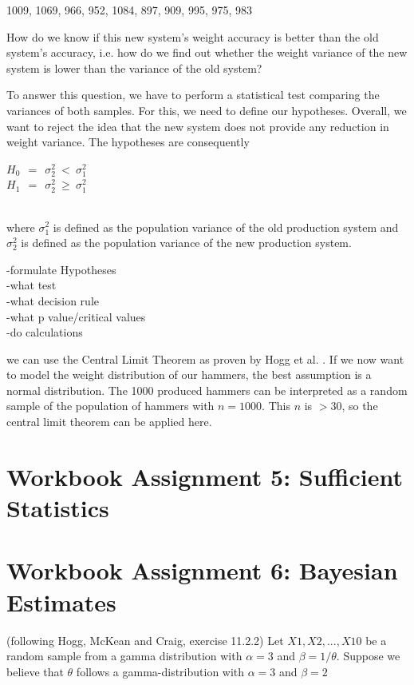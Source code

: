 \begin{center}
    1009, 1069, 966, 952, 1084, 897, 909, 995, 975, 983
\end{center}

How do we know if this new system's weight accuracy is better than the old system's accuracy, i.e. how do we find out whether the weight variance of the new system is lower than the variance of the old system?

To answer this question, we have to perform a statistical test comparing the variances of both samples. For this, we need to define our hypotheses. Overall, we want to reject the idea that the new system does not provide any reduction in weight variance. The hypotheses are consequently 
\\
\begin{center}
$H_0~~=~~ \sigma^2_2~<~\sigma^2_1$\\
$H_1~~=~~ \sigma^2_2~\geq~\sigma^2_1$
\end{center}
\\
where $\sigma^2_1$ is defined as the population variance of the old production system and $\sigma^2_2$ is defined as the population variance of the new production system.




-formulate Hypotheses\\
-what test\\
-what decision rule\\
-what p value/critical values\\
-do calculations




we can use the Central Limit Theorem as proven by Hogg et al. \cite[Theorem~5.3.1]{hogg}. 
If we now want to model the weight distribution of our hammers, the best assumption is a normal distribution. The 1000 produced hammers can be interpreted as a random sample of the population of hammers with $n = 1000$. This $n$ is $>30$, so the central limit theorem can be applied here. 



\chapter{Workbook Assignment 5: Sufficient Statistics}	
\chapter{Workbook Assignment 6: Bayesian Estimates}	

(following Hogg, McKean and Craig, exercise 11.2.2)
Let $X1, X2, ... , X10$ be a random sample from a gamma distribution with $\alpha =3$ and $\beta =1/\theta$. Suppose we believe that $\theta$ follows a gamma-distribution with $\alpha =3$ and $\beta = 2$

